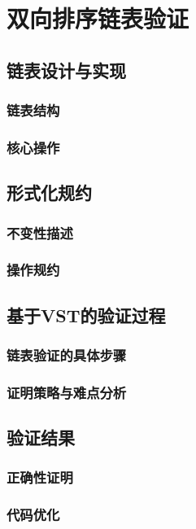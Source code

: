 \chapter{双向排序链表验证}
\section{链表设计与实现}
\subsection{链表结构}
\subsection{核心操作}
\section{形式化规约}
\subsection{不变性描述}
\subsection{操作规约}
\section{基于VST的验证过程}
\subsection{链表验证的具体步骤}
\subsection{证明策略与难点分析}
\section{验证结果}
\subsection{正确性证明}
\subsection{代码优化}

